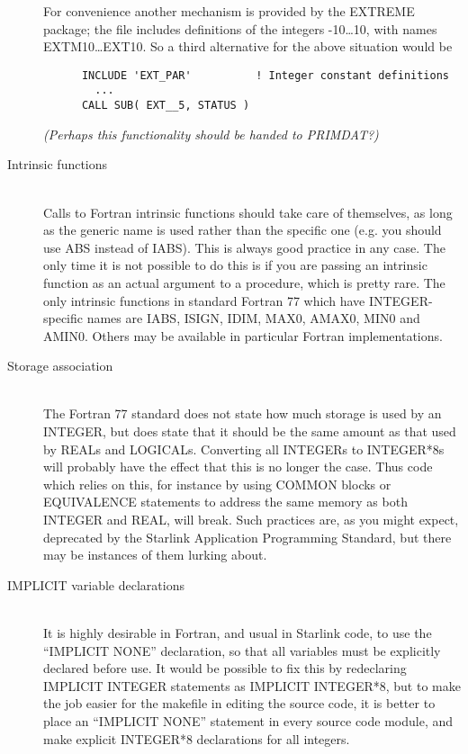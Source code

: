 \documentclass[twoside,11pt]{article}
\newcommand{\xref}[3]{#1}
\renewcommand{\_}{\texttt{\symbol{95}}}
\begin{document}
\begin{description}
For convenience another mechanism is provided by the EXTREME package;
the file \file{EXT\_PAR} includes definitions of the integers
-10\ldots 10, with names EXT\_\_M10\ldots EXT\_\_10.
So a third alternative for the above situation would be
\begin{squote}
\begin{verbatim}
      INCLUDE 'EXT_PAR'          ! Integer constant definitions
        ...
      CALL SUB( EXT__5, STATUS )
\end{verbatim}
\end{squote}
{\it (Perhaps this functionality should be handed to PRIMDAT?)}
%
\item[Intrinsic functions]\mbox{}
\\
Calls to Fortran intrinsic functions should take care of themselves,
as long as the generic name is used rather than the specific one
(e.g. you should use ABS instead of IABS).  This is always good
practice in any case.  The only time it is not possible to do 
this is if you are passing an intrinsic function as an actual
argument to a procedure, which is pretty rare.
The only intrinsic functions in standard Fortran 77 which have 
INTEGER-specific names are IABS, ISIGN, IDIM, MAX0, AMAX0, MIN0 and AMIN0.
Others may be available in particular Fortran implementations.
%
\item[Storage association]\mbox{}
\\
The Fortran 77 standard does not state how much storage is used by
an INTEGER, but does state that it should be the same amount as that
used by REALs and LOGICALs.
Converting all INTEGERs to INTEGER*8s will
probably have the effect that this is no longer the case.
Thus code which relies on this, for instance by using COMMON blocks or
EQUIVALENCE statements to address the same memory as both INTEGER and REAL,
will break.  
Such practices are, as you might expect, deprecated by the 
\xref{Starlink Application Programming Standard}{sgp16}{},
but there may be instances of them lurking about.
%
\item[IMPLICIT variable declarations]\mbox{}
\\
It is highly desirable in Fortran, and usual in Starlink code, to use
the ``IMPLICIT NONE'' declaration, so that all variables must be
explicitly declared before use.
It would be possible to fix this by redeclaring IMPLICIT INTEGER
statements as IMPLICIT INTEGER*8, but to make the job easier for
the makefile in editing the source code, it is better to place
an ``IMPLICIT NONE'' statement in every source code module, and
make explicit INTEGER*8 declarations for all integers.

\end{description}
\end{document}
